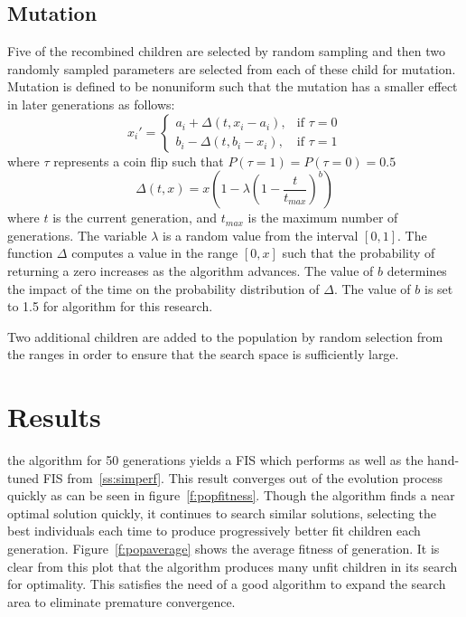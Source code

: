 \documentclass[submit]{aiaa-tc}%
\begin{document}
\subsection{Mutation}
Five of the recombined children are selected by random sampling and then two randomly sampled parameters are selected from each of these child for mutation. Mutation is defined to be nonuniform such that the mutation has a smaller effect in later generations as follows:
\begin{displaymath}
x_i'=
	\begin{cases}
	a_i+\Delta(t,x_i-a_i),& \text{if }\tau=0\\
	b_i-\Delta(t,b_i-x_i),& \text{if }\tau=1
	\end{cases}
\end{displaymath}
where $\tau$ represents a coin flip such that $P(\tau=1)=P(\tau=0)=0.5$
\begin{displaymath}
\Delta(t,x)=x(1-\lambda(1-\frac{t}{t_{max}})^b)
\end{displaymath}
\noindent
where $t$ is the current generation, and $t_{max}$ is the maximum number of generations. The variable $\lambda$ is a random value from the interval $[0,1]$. The function $\Delta$ computes a value in the range $[0,x]$ such that the probability of returning a zero increases as the algorithm advances. The value of $b$ determines the impact of the time on the probability distribution of $\Delta$. The value of $b$ is set to 1.5 for algorithm for this research.

Two additional children are added to the population by random selection from the ranges in order to ensure that the search space is sufficiently large. 

\section{Results}
 the algorithm for 50 generations yields a FIS which performs as well as the hand-tuned FIS from~\vref{ss:simperf}. This result converges out of the evolution process quickly as can be seen in figure~\vref{f:popfitness}. Though the algorithm finds a near optimal solution quickly, it continues to search similar solutions, selecting the best individuals each time to produce progressively better fit children each generation. Figure~\vref{f:popaverage} shows the average fitness of generation. It is clear from this plot that the algorithm produces many unfit children in its search for optimality. This satisfies the need of a good algorithm to expand the search area to eliminate premature convergence.
\end{document}
